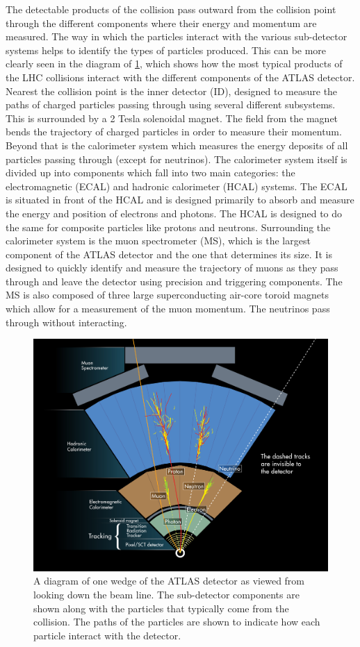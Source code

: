 The detectable products of the collision pass outward from the collision
point through the different components where their energy and momentum
are measured. The way in which the particles interact with the various
sub-detector systems helps to identify the types of 
particles produced.
This can be more clearly seen in the diagram of 
\fig\ref{fig:atlas_wedge}, which shows how the most typical
products of the LHC collisions interact with the different
components of the ATLAS detector.
Nearest the collision point is the inner detector (ID), designed to 
measure the paths of charged particles passing through using several
different subsystems. This 
is surrounded by a 2 Tesla solenoidal magnet.
The field from the magnet bends the trajectory of charged particles
in order to measure their momentum.
Beyond that is the calorimeter system
which measures the energy deposits of all particles passing 
through (except for neutrinos). The calorimeter system 
itself is divided up into components which fall into two main 
categories: the electromagnetic (ECAL)
and hadronic calorimeter (HCAL) systems.
The ECAL is situated in front of the HCAL and is designed
primarily to absorb and measure the energy and position of
electrons and photons. 
The HCAL is designed to do the same for
composite particles like protons and neutrons.
Surrounding the calorimeter system is the muon spectrometer (MS),
which is the largest component of the ATLAS detector and the one
that determines its size. It is designed to quickly identify and measure the 
trajectory of muons as they pass through
and leave the detector using precision 
and triggering components. The MS is also composed of 
three large superconducting air-core toroid magnets 
which allow for
a measurement of the muon momentum. The neutrinos 
pass through without interacting.

\begin{figure}[ht!]
\centering
\includegraphics[width=.9\textwidth]{figures/atlas/wedge.jpg}
\caption{A diagram of one wedge of the ATLAS detector
as viewed from looking down the beam line. 
The sub-detector components are shown along with the 
particles that typically come from the collision.
The paths of the particles are shown to indicate how each particle 
interact with the detector.}
\label{fig:atlas_wedge}
\end{figure}

